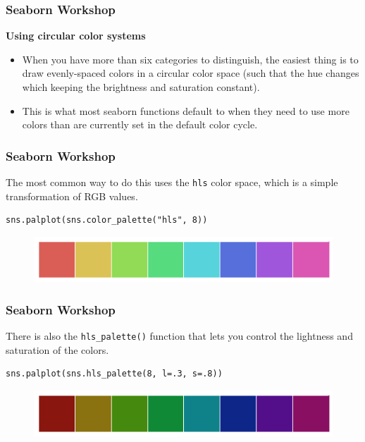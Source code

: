 \documentclass{beamer}
\begin{document}
\begin{frame}[fragile]
\frametitle{Seaborn Workshop}
\large
\noindent \textbf{Using circular color systems}
\begin{itemize}
\item When you have more than six categories to distinguish, the easiest thing is to draw evenly-spaced colors in a circular color space (such that the hue changes which keeping the brightness and saturation constant). 
\item This is what most seaborn functions default to when they need to use more colors than are currently set in the default color cycle.
\end{itemize}

\end{frame}
\begin{frame}[fragile]
	\frametitle{Seaborn Workshop}
	\large
The most common way to do this uses the \texttt{hls} color space, which is a simple transformation of RGB values.

\begin{verbatim}
sns.palplot(sns.color_palette("hls", 8))
\end{verbatim}
\begin{figure}
\centering
\includegraphics[width=0.9\linewidth]{images/color_palettes_10_0}


\end{figure}


\end{frame}
\begin{frame}[fragile]
	\frametitle{Seaborn Workshop}
	\large
There is also the \texttt{hls\_palette()} function that lets you control the lightness and saturation of the colors.
\begin{verbatim}
sns.palplot(sns.hls_palette(8, l=.3, s=.8))
\end{verbatim}
\begin{figure}
\centering
\includegraphics[width=0.9\linewidth]{images/color_palettes_12_0}
\end{figure}

\end{frame}
\end{document}

